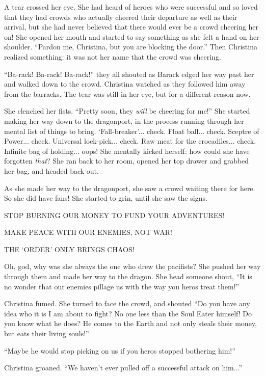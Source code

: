 \documentclass[showtrims,b6paper,draft,10pt]{memoir}
\begin{document}
A tear crossed her eye.  She had heard of heroes who were successful and so loved that they had crowds who actually cheered their departure as well as their arrival, but she had never believed that there would ever be a crowd cheering her on!  She opened her mouth and started to say something as she felt a hand on her shoulder.  ``Pardon me, Christina, but you are blocking the door.''  Then Christina realized something: it was not her name that the crowd was cheering.

``Ba-rack!  Ba-rack! Ba-rack!'' they all shouted as Barack edged her way past her and walked down to the crowd.  Christina watched as they followed him away from the barracks.  The tear was still in her eye, but for a different reason now.

She clenched her fists.  ``Pretty soon, they \emph{will} be cheering for me!''  She started making her way down to the dragonport, in the process running through her mental list of things to bring.  `Fall-breaker'... check.  Float ball... check.  Sceptre of Power... check.  Universal lock-pick... check.  Raw meat for the crocadiles... check.  Infinite bag of holding... oops!  She mentally kicked herself:  how could she have forgotten \emph{that}?  She ran back to her room, opened her top drawer and grabbed her bag, and headed back out.

As she made her way to the dragonport, she saw a crowd waiting there for here.  So she did have fans!  She started to grin, until she saw the signs.

STOP BURNING OUR MONEY TO FUND YOUR ADVENTURES!

MAKE PEACE WITH OUR ENEMIES, NOT WAR!

THE `ORDER' ONLY BRINGS CHAOS!

Oh, god, why was she always the one who drew the pacifists?  She pushed her way through them and made her way to the dragon.  She head someone shout,  ``It is no wonder that our enemies pillage us with the way you heros treat them!''

Christina fumed.  She turned to face the crowd, and shouted ``Do you have any idea who it is I am about to fight?  No one less than the Soul Eater himself!  Do you know what he does?  He comes to the Earth and not only steals their money, but eats their living souls!''

``Maybe he would stop picking on us if you heros stopped bothering him!''

Christina groaned.  ``We haven't ever pulled off a successful attack on him...''
\end{document}
